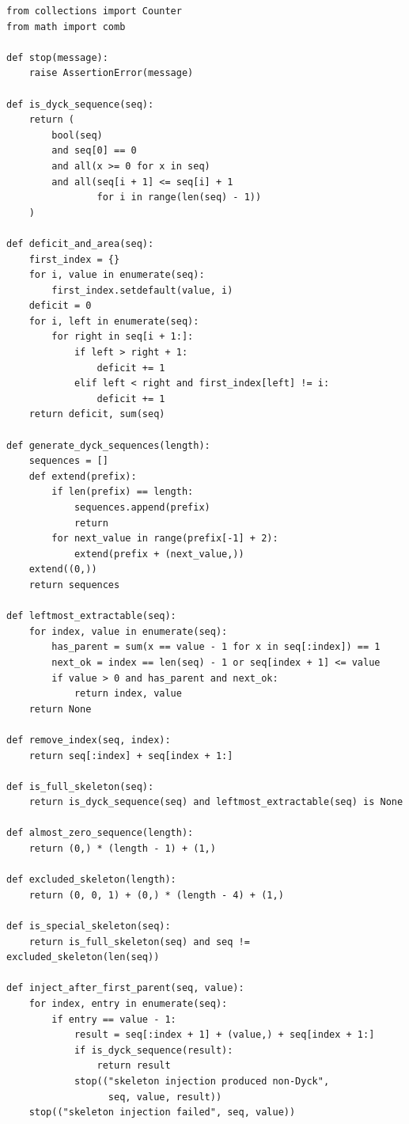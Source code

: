 \documentclass[11pt]{article}
\theoremstyle{plain}
\theoremstyle{definition}
\theoremstyle{remark}
\begin{document}
\begin{lstlisting}
from collections import Counter
from math import comb

def stop(message):
    raise AssertionError(message)

def is_dyck_sequence(seq):
    return (
        bool(seq)
        and seq[0] == 0
        and all(x >= 0 for x in seq)
        and all(seq[i + 1] <= seq[i] + 1
                for i in range(len(seq) - 1))
    )

def deficit_and_area(seq):
    first_index = {}
    for i, value in enumerate(seq):
        first_index.setdefault(value, i)
    deficit = 0
    for i, left in enumerate(seq):
        for right in seq[i + 1:]:
            if left > right + 1:
                deficit += 1
            elif left < right and first_index[left] != i:
                deficit += 1
    return deficit, sum(seq)

def generate_dyck_sequences(length):
    sequences = []
    def extend(prefix):
        if len(prefix) == length:
            sequences.append(prefix)
            return
        for next_value in range(prefix[-1] + 2):
            extend(prefix + (next_value,))
    extend((0,))
    return sequences

def leftmost_extractable(seq):
    for index, value in enumerate(seq):
        has_parent = sum(x == value - 1 for x in seq[:index]) == 1
        next_ok = index == len(seq) - 1 or seq[index + 1] <= value
        if value > 0 and has_parent and next_ok:
            return index, value
    return None

def remove_index(seq, index):
    return seq[:index] + seq[index + 1:]

def is_full_skeleton(seq):
    return is_dyck_sequence(seq) and leftmost_extractable(seq) is None

def almost_zero_sequence(length):
    return (0,) * (length - 1) + (1,)

def excluded_skeleton(length):
    return (0, 0, 1) + (0,) * (length - 4) + (1,)

def is_special_skeleton(seq):
    return is_full_skeleton(seq) and seq != excluded_skeleton(len(seq))

def inject_after_first_parent(seq, value):
    for index, entry in enumerate(seq):
        if entry == value - 1:
            result = seq[:index + 1] + (value,) + seq[index + 1:]
            if is_dyck_sequence(result):
                return result
            stop(("skeleton injection produced non-Dyck",
                  seq, value, result))
    stop(("skeleton injection failed", seq, value))


\end{lstlisting}
\end{document}
